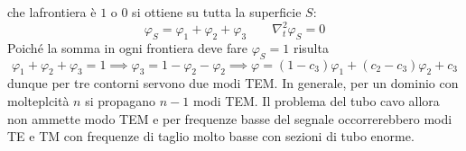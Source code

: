 \documentclass{book}
\begin{document}
        che lafrontiera è $1$ o $0$ si ottiene su tutta la superficie $S$:
        \begin{equation}
            \varphi_{S} = \varphi_{1}+\varphi_{2}+\varphi_{3} \qquad \nabla_{t} ^{2} \varphi_{S} = 0
        \end{equation} 
        Poiché la somma in ogni frontiera deve fare $\varphi_{S} = 1$ risulta
        \begin{equation}
            \varphi_{1}+\varphi_{2}+\varphi_{3} = 1 \implies \varphi_{3} = 1- \varphi_{2} - \varphi_{2} \implies \varphi = (1-c_{3})\varphi_{1}+(c_{2}-c_{3})\varphi_{2}+c_{3}
        \end{equation}
        dunque per tre contorni servono due modi TEM. In generale, per un dominio con molteplcità $n$ si propagano $n-1$ modi TEM. Il problema del tubo cavo allora non ammette modo TEM e per frequenze 
        basse del segnale occorrerebbero modi TE e TM con frequenze di taglio molto basse con sezioni di tubo enorme. \newpage
\end{document}
